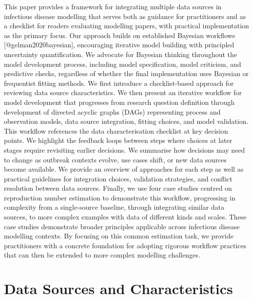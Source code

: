\documentclass{article}
\begin{document}
This paper provides a framework for integrating multiple data sources in infectious disease modelling that serves both as guidance for practitioners and as a checklist for readers evaluating modelling papers, with practical implementation as the primary focus. 
Our approach builds on established Bayesian workflows [@gelman2020bayesian], encouraging iterative model building with principled uncertainty quantification. We advocate for Bayesian thinking throughout the model development process, including model specification, model criticism, and predictive checks, regardless of whether the final implementation uses Bayesian or frequentist fitting methods. 
We first introduce a checklist-based approach for reviewing data source characteristics. 
We then present an iterative workflow for model development that progresses from research question definition through development of directed acyclic graphs (DAGs) representing process and observation models, data source integration, fitting choices, and model validation. 
This workflow references the data characterisation checklist at key decision points. We highlight the feedback loops between steps where choices at later stages require revisiting earlier decisions. 
We summarise how decisions may need to change as outbreak contexts evolve, use cases shift, or new data sources become available. 
We provide an overview of approaches for each step as well as practical guidelines for integration choices, validation strategies, and conflict resolution between data sources. 
Finally, we use four case studies centred on reproduction number estimation to demonstrate this workflow, progressing in complexity from a single-source baseline, through integrating similar data sources, to more complex examples with data of different kinds and scales. 
These case studies demonstrate broader principles applicable across infectious disease modelling contexts. 
By focusing on this common estimation task, we provide practitioners with a concrete foundation for adopting rigorous workflow practices that can then be extended to more complex modelling challenges.

\section{Data Sources and Characteristics} \label{sec:datareview}

\end{document}
